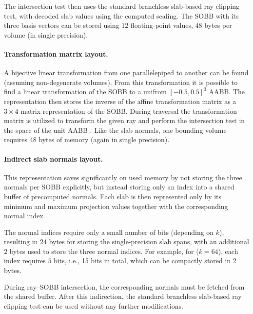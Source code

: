 The intersection test then uses the standard branchless slab-based ray clipping test, with decoded slab values using the computed scaling. The SOBB with its three basis vectors can be stored using $12$ floating-point values, $48$ bytes per volume (in single precision). \cite{KB25}

\paragraph{Transformation matrix layout.} A bijective linear transformation from one parallelepiped to another can be found (assuming non-degenerate volumes). From this transformation it is possible to find a linear transformation of the SOBB to a unifrom $[-0.5, 0.5]^3$ AABB. The representation then stores the inverse of the affine transformation matrix as a $3 \times 4$ matrix representation of the SOBB. During traversal the transformation matrix is utilized to transform the given ray and perform the intersection test in the space of the unit AABB \cite{SVCNM21}. Like the slab normals, one bounding volume requires $48$ bytes of memory (again in single precision). \cite{KB25}

\paragraph{Indirect slab normals layout.} This representation saves significantly on used memory by not storing the three normals per SOBB explicitly, but instead storing only an index into a shared buffer of precomputed normals. Each slab is then represented only by its minimum and maximum projection values together with the corresponding normal index.

The normal indices require only a small number of bits (depending on $k$), resulting in $24$ bytes for storing the single-precision slab spans, with an additional $2$ bytes used to store the three normal indices. For example, for ($k = 64$), each index requires $5$ bits, i.e., 15 bits in total, which can be compactly stored in 2 bytes.

During ray--SOBB intersection, the corresponding normals must be fetched from the shared buffer. After this indirection, the standard branchless slab-based ray clipping test can be used without any further modifications.

